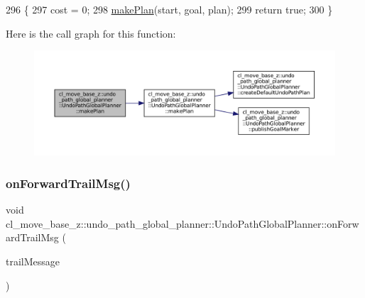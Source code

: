 \begin{DoxyCode}
296         \{
297             cost = 0;
298             \hyperlink{classcl__move__base__z_1_1undo__path__global__planner_1_1UndoPathGlobalPlanner_a46034d27c0811abae440009457a7f8b0}{makePlan}(start, goal, plan);
299             \textcolor{keywordflow}{return} \textcolor{keyword}{true};
300         \}
\end{DoxyCode}
Here is the call graph for this function\+:
\nopagebreak
\begin{figure}[H]
\begin{center}
\leavevmode
\includegraphics[width=350pt]{classcl__move__base__z_1_1undo__path__global__planner_1_1UndoPathGlobalPlanner_aca09f640e4bda4d5ccc9613276fd3f71_cgraph}
\end{center}
\end{figure}
\mbox{\label{classcl__move__base__z_1_1undo__path__global__planner_1_1UndoPathGlobalPlanner_ae5e3c5922ceb8783a6a01d904fc9c230}} 
\subsubsection{\texorpdfstring{on\+Forward\+Trail\+Msg()}{onForwardTrailMsg()}}
{\footnotesize\ttfamily void cl\+\_\+move\+\_\+base\+\_\+z\+::undo\+\_\+path\+\_\+global\+\_\+planner\+::\+Undo\+Path\+Global\+Planner\+::on\+Forward\+Trail\+Msg (\begin{DoxyParamCaption}\item[{const nav\+\_\+msgs\+::\+Path\+::\+Const\+Ptr \&}]{trail\+Message }\end{DoxyParamCaption})\hspace{0.3cm}{\ttfamily [private]}}

